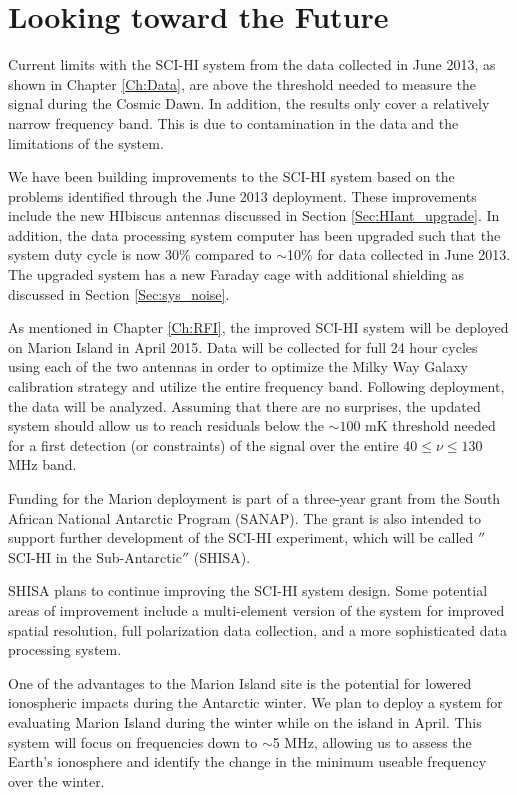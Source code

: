 \chapter{Looking toward the Future}\label{Ch:Conclude}

Current limits with the SCI-HI system from the data collected in June 2013, as shown in Chapter \ref{Ch:Data}, are above the threshold needed to measure the \cm signal during the Cosmic Dawn. In addition, the results only cover a relatively narrow frequency band. This is due to contamination in the data and the limitations of the system. 

We have been building improvements to the SCI-HI system based on the problems identified through the June 2013 deployment. These improvements include the new HIbiscus antennas discussed in Section \ref{Sec:HIant_upgrade}. In addition, the data processing system computer has been upgraded such that the system duty cycle is now 30\% compared to $\sim$10\% for data collected in June 2013. The upgraded system has a new Faraday cage with additional shielding as discussed in Section \ref{Sec:sys_noise}. 

As mentioned in Chapter \ref{Ch:RFI}, the improved SCI-HI system will be deployed on Marion Island in April 2015. Data will be collected for full 24 hour cycles using each of the two antennas in order to optimize the Milky Way Galaxy calibration strategy and utilize the entire frequency band. Following deployment, the data will be analyzed. Assuming that there are no surprises, the updated system should allow us to reach residuals below the $\sim100$ mK threshold needed for a first detection (or constraints) of the \cm signal over the entire $40 \leq \nu \leq 130$ MHz band. 

Funding for the Marion deployment is part of a three-year grant from the South African National Antarctic Program (SANAP). The grant is also intended to support further development of the SCI-HI experiment, which will be called $''$SCI-HI in the Sub-Antarctic$''$ (SHISA). 

SHISA plans to continue improving the SCI-HI system design. Some potential areas of improvement include a multi-element version of the system for improved spatial resolution, full polarization data collection, and a more sophisticated data processing system. 

One of the advantages to the Marion Island site is the potential for lowered ionospheric impacts during the Antarctic winter. We plan to deploy a system for evaluating Marion Island during the winter while on the island in April. This system will focus on frequencies down to $\sim$5 MHz, allowing us to assess the Earth's ionosphere and identify the change in the minimum useable frequency over the winter. 
